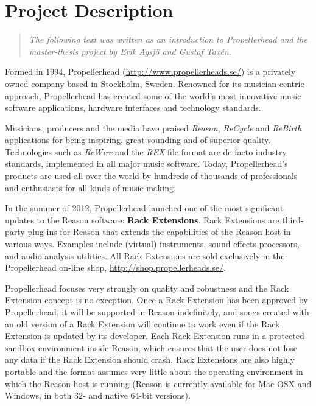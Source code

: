 \chapter* {Project Description}

\begin {quote}
    \emph {The following text was written as an introduction to Propellerhead
           and the master-thesis project by Erik Agsjö and Gustaf Taxén.}
\end {quote}

Formed in 1994, Propellerhead (\url {http://www.propellerheads.se/}) is a
privately owned company based in Stockholm, Sweden. Renowned for its
musician-centric approach, Propellerhead has created some of the world's most
innovative music software applications, hardware interfaces and technology
standards.

Musicians, producers and the media have praised \emph {Reason}, \emph {ReCycle}
and \emph {ReBirth} applications for being inspiring, great sounding and of
superior quality. Technologies such as \emph {ReWire} and the \emph {REX} file
format are de-facto industry standards, implemented in all major music software.
Today, Propellerhead’s products are used all over the world by hundreds of
thousands of professionals and enthusiasts for all kinds of music making.

In the summer of 2012, Propellerhead launched one of the most significant
updates to the Reason software: \textbf {Rack Extensions}. Rack Extensions are
third-party plug-ins for Reason that extends the capabilities of the Reason host
in various ways. Examples include (virtual) instruments, sound effects
processors, and audio analysis utilities. All Rack Extensions are sold
exclusively in the Propellerhead on-line shop,
\url {http://shop.propellerheads.se/}.

Propellerhead focuses very strongly on quality and robustness and the Rack
Extension concept is no exception. Once a Rack Extension has been approved by
Propellerhead, it will be supported in Reason indefinitely, and songs created
with an old version of a Rack Extension will continue to work even if the Rack
Extension is updated by its developer. Each Rack Extension runs in a protected
sandbox environment inside Reason, which ensures that the user does not lose any
data if the Rack Extension should crash. Rack Extensions are also highly
portable and the format assumes very little about the operating environment in
which the Reason host is running (Reason is currently available for Mac OSX and
Windows, in both 32- and native 64-bit versions).

